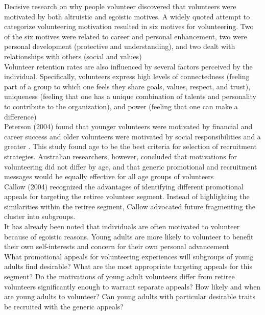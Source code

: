 \documentclass[11pt,fleqn]{book} %
\begin{document}
Decisive research on why people volunteer discovered that
volunteers were motivated by both altruistic and egoistic motives. A widely quoted attempt to categorize volunteering
motivation resulted in six motives for volunteering. Two of the six motives
were related to career and personal enhancement, two were personal development (protective and understanding), 
and two dealt with relationships with others (social and values)\\

Volunteer retention rates
are also influenced by several factors perceived by the individual.
Specifically, volunteers express high levels of connectedness (feeling part
of a group to which one feels they share goals, values, respect, and trust),
uniqueness (feeling that one has a unique combination of talents and
personality to contribute to the organization), and power (feeling that one
can make a difference)\\

Peterson (2004) found that younger volunteers were motivated by
financial and career success and older volunteers were motivated by social
responsibilities and a greater . This study found age to
be the best criteria for selection of recruitment strategies. Australian
researchers, however, concluded that motivations for volunteering did not
differ by age, and that generic promotional and recruitment messages
would be equally effective for all age groups of volunteers\\

Callow (2004) recognized the advantages of
identifying different promotional appeals for targeting the retiree volunteer
segment. Instead of highlighting the similarities within the retiree segment,
Callow advocated future fragmenting the cluster into subgroups.\\

It has already been noted that individuals are often motivated to
volunteer because of egoistic reasons. Young adults are more likely to
volunteer to benefit their own self-interests and concern for their own
personal advancement\\

What promotional appeals for volunteering experiences will subgroups
of young adults find desirable? What are the most appropriate targeting
appeals for this segment? Do the motivations of young adult volunteers differ
from retiree volunteers significantly enough to warrant separate appeals?
How likely and when are young adults to volunteer? Can young adults with
particular desirable traits be recruited with the generic appeals?\\
\end{document}
